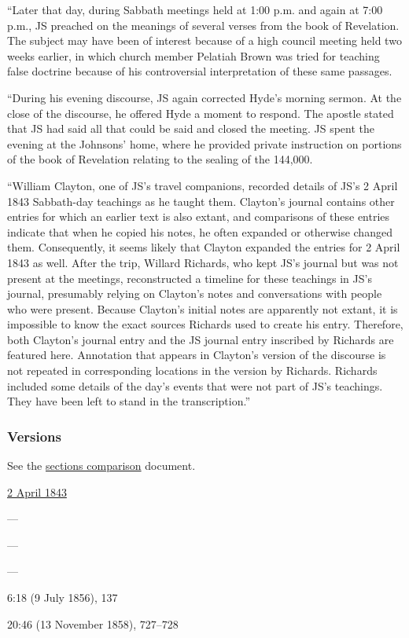 			``Later that day, during Sabbath meetings held at 1:00 p.m. and again at 7:00 p.m., JS preached on the meanings of several verses from the book of Revelation. The subject may have been of interest because of a high council meeting held two weeks earlier, in which church member Pelatiah Brown was tried for teaching false doctrine because of his controversial interpretation of these same passages. 

			``During his evening discourse, JS again corrected Hyde's morning sermon. At the close of the discourse, he offered Hyde a moment to respond. The apostle stated that JS had said all that could be said and closed the meeting. JS spent the evening at the Johnsons' home, where he provided private instruction on portions of the book of Revelation relating to the sealing of the 144,000.
			
			``William Clayton, one of JS's travel companions, recorded details of JS's 2 April 1843 Sabbath-day teachings as he taught them. Clayton's journal contains other entries for which an earlier text is also extant, and comparisons of these entries indicate that when he copied his notes, he often expanded or otherwise changed them. Consequently, it seems likely that Clayton expanded the entries for 2 April 1843 as well. After the trip, Willard Richards, who kept JS's journal but was not present at the meetings, reconstructed a timeline for these teachings in JS's journal, presumably relying on Clayton's notes and conversations with people who were present. Because Clayton's initial notes are apparently not extant, it is impossible to know the exact sources Richards used to create his entry. Therefore, both Clayton's journal entry and the JS journal entry inscribed by Richards are featured here. Annotation that appears in Clayton's version of the discourse is not repeated in corresponding locations in the version by Richards. Richards included some details of the day's events that were not part of JS's teachings. They have been left to stand in the transcription.''			
					
	\subsubsection{Versions}
		\label{DC130-V}
		
		See the \href{https://drive.google.com/file/d/1goAvNz8jS4R8slYfMG_db55Ty2z_vmgK/view?usp=sharing}{sections comparison} document.
	
		\begin{compactdesc}
			\item[JSP] \hyperref[EMS-1843-JS-2-APR-1843]{2 April 1843}
			\item[BC] ---
			\item[DC 1835] ---
			\item[DC 1844] ---
			\item[DN] 6:18 (9 July 1856), 137
			\item[MS] 20:46 (13 November 1858), 727--728
		\end{compactdesc}

